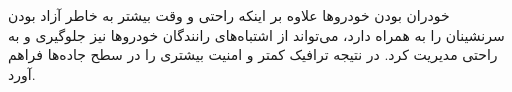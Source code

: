 خودران بودن خودروها علاوه بر اینکه راحتی و وقت بیشتر به خاطر آزاد بودن سرنشینان را به همراه دارد، می‌تواند از اشتباه‌های رانندگان خودروها نیز جلوگیری و به راحتی مدیریت کرد. در نتیجه ترافیک کمتر و امنیت بیشتری را در سطح جاده‌ها فراهم آورد.



















